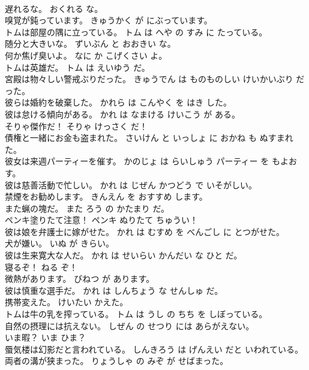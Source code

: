 \documentclass[8pt]{extreport}
\begin{document}
\begin{CJK}{UTF8}{min}
\\	遅れるな。	おくれる な。	
\\	嗅覚が鈍っています。	きゅうかく が にぶっています。	
\\	トムは部屋の隅に立っている。	トム は へや の すみ に たっている。	
\\	随分と大きいな。	ずいぶん と おおきい な。	
\\	何か焦げ臭いよ。	なに か こげくさい よ。	
\\	トムは英雄だ。	トム は えいゆう だ。	
\\	宮殿は物々しい警戒ぶりだった。	きゅうでん は ものものしい けいかいぶり だった。	
\\	彼らは婚約を破棄した。	かれら は こんやく を はき した。	
\\	彼は怠ける傾向がある。	かれ は なまける けいこう が ある。	
\\	そりゃ傑作だ！	そりゃ けっさく だ！	
\\	債権と一緒にお金も盗まれた。	さいけん と いっしょ に おかね も ぬすまれた。	
\\	彼女は来週パーティーを催す。	かのじょ は らいしゅう パーティー を もよおす。	
\\	彼は慈善活動で忙しい。	かれ は じぜん かつどう で いそがしい。	
\\	禁煙をお勧めします。	きんえん を おすすめ します。	
\\	また蝋の塊だ。	また ろう の かたまり だ。	
\\	ペンキ塗りたて注意！	ペンキ ぬりたて ちゅうい！	
\\	彼は娘を弁護士に嫁がせた。	かれ は むすめ を べんごし に とつがせた。	
\\	犬が嫌い。	いぬ が きらい。	
\\	彼は生来寛大な人だ。	かれ は せいらい かんだい な ひと だ。	
\\	寝るぞ！	ねる ぞ！	
\\	微熱があります。	びねつ が あります。	
\\	彼は慎重な選手だ。	かれ は しんちょう な せんしゅ だ。	
\\	携帯変えた。	けいたい かえた。	
\\	トムは牛の乳を搾っている。	トム は うし の ちち を しぼっている。	
\\	自然の摂理には抗えない。	しぜん の せつり には あらがえない。	
\\	いま暇？	いま ひま？	
\\	蜃気楼は幻影だと言われている。	しんきろう は げんえい だと いわれている。	
\\	両者の溝が狭まった。	りょうしゃ の みぞ が せばまった。	

\end{CJK}
\end{document}
